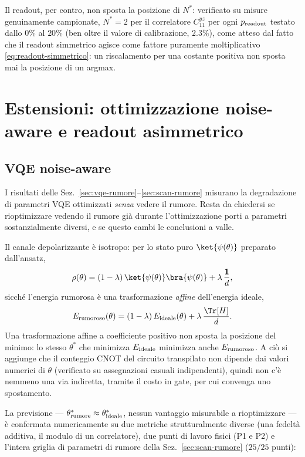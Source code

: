 \documentclass[11pt,a4paper]{article}
\begin{document}
Il readout, per contro, non sposta la posizione di $N^*$: verificato su
misure genuinamente campionate, $N^*=2$ per il correlatore $C_{11}^{yz}$
per ogni $p_{\rm readout}$ testato dallo $0\%$ al $20\%$ (ben oltre il
valore di calibrazione, $2.3\%$), come atteso dal fatto che il readout
simmetrico agisce come fattore puramente moltiplicativo
\eqref{eq:readout-simmetrico}: un riscalamento per una costante positiva
non sposta mai la posizione di un argmax.

\section{Estensioni: ottimizzazione noise-aware e readout asimmetrico}
\label{sec:estensioni}

\subsection{VQE noise-aware}
\label{sec:noise-aware}

I risultati delle Sez.~\ref{sec:vqe-rumore}--\ref{sec:scan-rumore}
misurano la degradazione di parametri VQE ottimizzati \emph{senza} vedere
il rumore. Resta da chiedersi se rioptimizzare vedendo il rumore già
durante l'ottimizzazione porti a parametri sostanzialmente diversi, e se
questo cambi le conclusioni a valle.

Il canale depolarizzante è isotropo: per lo stato puro
$\ket{\psi(\theta)}$ preparato dall'ansatz,
\begin{equation}
\rho(\theta) = (1-\lambda)\,\ket{\psi(\theta)}\bra{\psi(\theta)} + \lambda\,\frac{\mathbf 1}{d},
\end{equation}
sicché l'energia rumorosa è una trasformazione \emph{affine}
dell'energia ideale,
\begin{equation}
E_{\rm rumoroso}(\theta) = (1-\lambda)\,E_{\rm ideale}(\theta) + \lambda\,\frac{\Tr[H]}{d}.
\label{eq:affine-energia}
\end{equation}
Una trasformazione affine a coefficiente positivo non sposta la posizione
del minimo: lo stesso $\theta^*$ che minimizza $E_{\rm ideale}$ minimizza
anche $E_{\rm rumoroso}$. A ciò si aggiunge che il conteggio CNOT del
circuito transpilato non dipende dai valori numerici di $\theta$
(verificato su assegnazioni casuali indipendenti), quindi non c'è nemmeno
una via indiretta, tramite il costo in gate, per cui convenga uno
spostamento.

La previsione --- $\theta^*_{\rm rumore}\approx\theta^*_{\rm ideale}$,
nessun vantaggio misurabile a rioptimizzare --- è confermata numericamente
su due metriche strutturalmente diverse (una fedeltà additiva, il modulo
di un correlatore), due punti di lavoro fisici (P1 e P2) e l'intera
griglia di parametri di rumore della Sez.~\ref{sec:scan-rumore}
($25/25$ punti):
\end{document}

